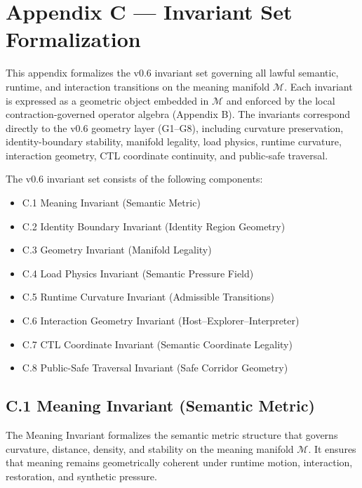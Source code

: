 \section*{Appendix C — Invariant Set Formalization}

\noindent This appendix formalizes the v0.6 invariant set governing all lawful
semantic, runtime, and interaction transitions on the meaning manifold
$\mathcal{M}$. Each invariant is expressed as a geometric object embedded in
$\mathcal{M}$ and enforced by the local contraction-governed operator algebra
(Appendix B). The invariants correspond directly to the v0.6 geometry layer
(G1--G8), including curvature preservation, identity-boundary stability,
manifold legality, load physics, runtime curvature, interaction geometry, CTL
coordinate continuity, and public-safe traversal.

\medskip

\noindent The v0.6 invariant set consists of the following components:

\begin{itemize}
    \item C.1 Meaning Invariant (Semantic Metric)
    \item C.2 Identity Boundary Invariant (Identity Region Geometry)
    \item C.3 Geometry Invariant (Manifold Legality)
    \item C.4 Load Physics Invariant (Semantic Pressure Field)
    \item C.5 Runtime Curvature Invariant (Admissible Transitions)
    \item C.6 Interaction Geometry Invariant (Host–Explorer–Interpreter)
    \item C.7 CTL Coordinate Invariant (Semantic Coordinate Legality)
    \item C.8 Public-Safe Traversal Invariant (Safe Corridor Geometry)
\end{itemize}

\subsection*{C.1 Meaning Invariant (Semantic Metric)}

\noindent The Meaning Invariant formalizes the semantic metric structure that
governs curvature, distance, density, and stability on the meaning manifold
$\mathcal{M}$. It ensures that meaning remains geometrically coherent under
runtime motion, interaction, restoration, and synthetic pressure.

